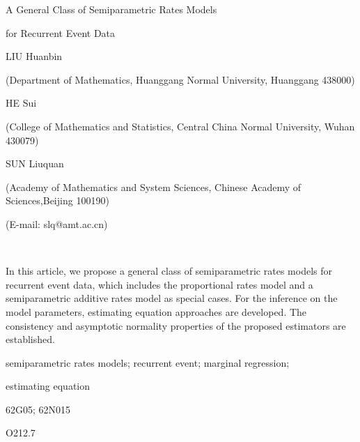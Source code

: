 \documentclass[twoside,a4paper,UTF8]{ctexart}
\begin{document}
\vbox{\vskip15pt}

\centerline{\four A General Class of Semiparametric Rates Models}  
\vskip2pt
\centerline{\four for Recurrent Event Data}
\vskip12pt
\centerline{\two LIU Huanbin}
\vskip5pt
\centerline{({\three Department of Mathematics, Huanggang Normal University, Huanggang} {\small 438000})}
\vskip7pt
\centerline{\two HE Sui}
\vskip5pt
\centerline{({\three College of Mathematics and Statistics, Central China Normal University, Wuhan} {\small 430079})}    
\vskip7pt
\centerline{\two SUN Liuquan}
\vskip5pt
\centerline{({\three Academy of Mathematics and System Sciences, Chinese Academy of Sciences,Beijing} {\small 100190})}
\vskip2pt
\centerline{({\three E-mail: slq@amt.ac.cn})}

\

\quad In this article, we propose a general class of semiparametric rates
 models for recurrent event data, which includes the proportional rates model and
 a semiparametric additive rates model  as special cases. For the inference on the model parameters,
 estimating equation approaches are developed. The consistency and asymptotic normality properties of
 the proposed estimators are established. 

\vskip5pt

\quad semiparametric rates models; recurrent event; marginal regression; 

\hskip1.54cm estimating equation

\quad 62G05; 62N015

\quad O212.7

    

 
\end{document}
